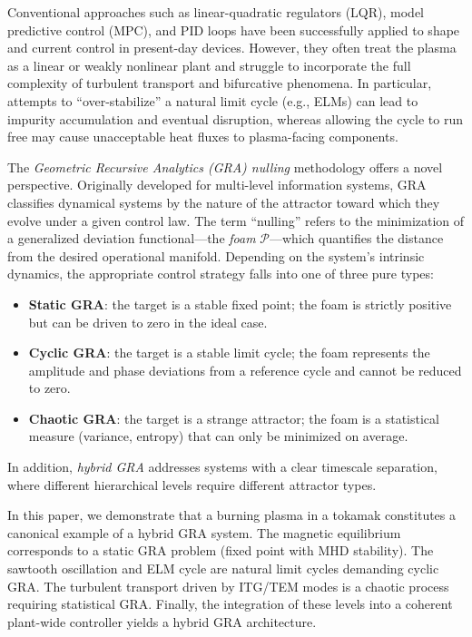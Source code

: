 \documentclass[12pt,a4paper]{article}
\begin{document}
Conventional approaches such as linear-quadratic regulators (LQR), model predictive control (MPC), and PID loops have been successfully applied to shape and current control in present-day devices. However, they often treat the plasma as a linear or weakly nonlinear plant and struggle to incorporate the full complexity of turbulent transport and bifurcative phenomena. In particular, attempts to ``over-stabilize'' a natural limit cycle (e.g., ELMs) can lead to impurity accumulation and eventual disruption, whereas allowing the cycle to run free may cause unacceptable heat fluxes to plasma-facing components.

The \textit{Geometric Recursive Analytics (GRA) nulling} methodology \cite{Petrov2025} offers a novel perspective. Originally developed for multi-level information systems, GRA classifies dynamical systems by the nature of the attractor toward which they evolve under a given control law. The term ``nulling'' refers to the minimization of a generalized deviation functional—the \textit{foam} $\mathcal{P}$—which quantifies the distance from the desired operational manifold. Depending on the system's intrinsic dynamics, the appropriate control strategy falls into one of three pure types:
\begin{itemize}
    \item \textbf{Static GRA}: the target is a stable fixed point; the foam is strictly positive but can be driven to zero in the ideal case.
    \item \textbf{Cyclic GRA}: the target is a stable limit cycle; the foam represents the amplitude and phase deviations from a reference cycle and cannot be reduced to zero.
    \item \textbf{Chaotic GRA}: the target is a strange attractor; the foam is a statistical measure (variance, entropy) that can only be minimized on average.
\end{itemize}
In addition, \textit{hybrid GRA} addresses systems with a clear timescale separation, where different hierarchical levels require different attractor types.

In this paper, we demonstrate that a burning plasma in a tokamak constitutes a canonical example of a hybrid GRA system. The magnetic equilibrium corresponds to a static GRA problem (fixed point with MHD stability). The sawtooth oscillation and ELM cycle are natural limit cycles demanding cyclic GRA. The turbulent transport driven by ITG/TEM modes is a chaotic process requiring statistical GRA. Finally, the integration of these levels into a coherent plant-wide controller yields a hybrid GRA architecture.
\end{document}
